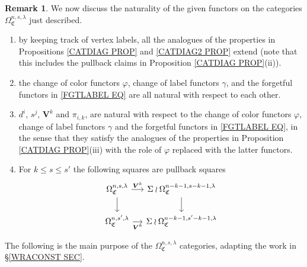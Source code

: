 \documentclass[a4paper,10pt
,draft
]{article}%
\numberwithin{equation}{section}
\numberwithin{figure}{section}
\theoremstyle{definition} %
\newtheorem{remark}[equation]{Remark}%
\newcommand{\1}{\ensuremath{\mathbbm 1}}%
\begin{document}
\begin{remark}
We now discuss the naturality of the given functors on the categories
$\Omega_{\mathfrak{C}}^{n,s,\lambda}$ just described.
\begin{enumerate}[label=(\roman*)]
\item by keeping track of vertex labels, all the analogues of the properties in Propositions \ref{CATDIAG PROP} and \ref{CATDIAG2 PROP} extend (note that this includes the pullback claims in 
Proposition \ref{CATDIAG PROP}(ii)).
\item the change of color functors $\varphi$, change of label functors $\gamma$, and the forgetful functors in
\eqref{FGTLABEL EQ} are all natural with respect to each other.
\item $d^i$, $s^j$, $\boldsymbol{V}^k$
and $\pi_{i,k}$, are natural with respect to the change of color functors $\varphi$, change of label functors $\gamma$ and the forgetful functors in
\eqref{FGTLABEL EQ}, 
in the sense that they satisfy the analogues of the properties in 
Proposition \ref{CATDIAG PROP}(iii) with 
the role of $\varphi$ replaced with the latter functors.
\item
For $k \leq s \leq s'$ the following squares are pullback squares
\[
\begin{tikzcd}[column sep = small, row sep = small]
	\Omega^{n,s,\lambda}_{\mathfrak{C}} \ar{r}{\boldsymbol{V}^k} \ar{dd} &
	\Sigma \wr \Omega^{n-k-1,s-k-1,\lambda}_{\mathfrak{C}} \ar{dd}
\\
\\
	\Omega^{n,s',\lambda}_{\mathfrak{C}} \ar{r}[swap]{\boldsymbol{V}^k} &
	\Sigma \wr \Omega^{n-k-1,s'-k-1,\lambda}_{\mathfrak{C}}
\end{tikzcd}
\]
\end{enumerate}
\end{remark}

The following is the main purpose of the 
$\Omega_{\mathfrak{C}}^{n,s,\lambda}$ categories,
adapting the work in \S \ref{WRACONST SEC}.
\end{document}
